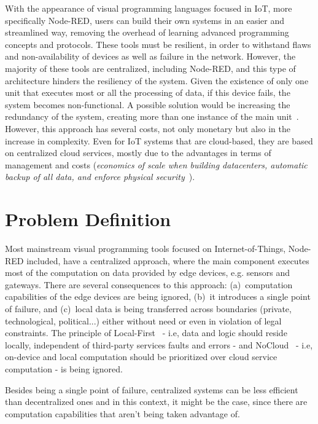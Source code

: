 With the appearance of visual programming languages focused in IoT, more specifically Node-RED, users can build their own systems in an easier and streamlined way, removing the overhead of learning advanced programming concepts and protocols. These tools must be resilient, in order to withstand flaws and non-availability of devices as well as failure in the network. However, the majority of these tools are centralized, including Node-RED, and this type of architecture hinders the resiliency of the system. Given the existence of only one unit that executes most or all the processing of data, if this device fails, the system becomes non-functional. A possible solution would be increasing the redundancy of the system, creating more than one instance of the main unit~\cite{SMARSLY20141}. However, this approach has several costs, not only monetary but also in the increase in complexity. Even for IoT systems that are cloud-based, they are based on centralized cloud services, mostly due to the advantages in terms of management and costs (\eg \textit{economics of scale when building datacenters, automatic backup of all data, and enforce physical security}~\cite{Want15}).

\section{Problem Definition} \label{sec:problem_definition}

Most mainstream visual programming tools focused on Internet-of-Things, Node-RED included, have a centralized approach, where the main component executes most of the computation on data provided by edge devices, e.g. sensors and gateways. There are several consequences to this approach: (a)~computation capabilities of the edge devices are being ignored, (b)~it introduces a single point of failure, and (c)~local data is being transferred across boundaries (private, technological, political...) either without need or even in violation of legal constraints. The principle of Local-First~\cite{localfist} - i.e, data and logic should reside locally, independent of third-party services faults and errors - and NoCloud~\cite{nocloud} - i.e, on-device and local computation should be prioritized over cloud service computation - is being ignored. 

Besides being a single point of failure, centralized systems can be less efficient than decentralized ones and in this context, it might be the case, since there are computation capabilities that aren't being taken advantage of.

